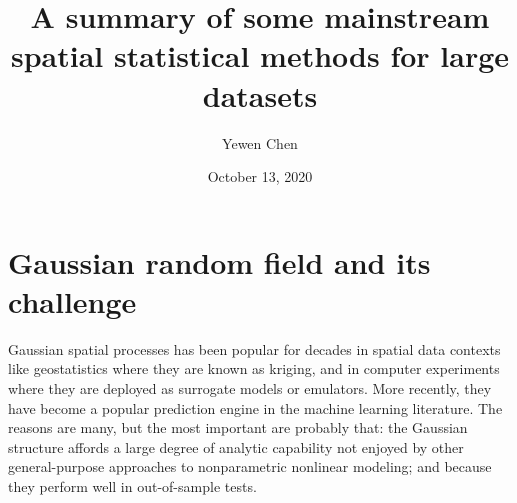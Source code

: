 \documentclass[
12pt, %
a4paper, %
oneside, %
headinclude,footinclude, %
BCOR5mm, %
]{scrartcl}
\title{{A summary of some mainstream spatial statistical methods for large datasets}} %
\author{{Yewen Chen}} %
\date{\normalsize{October 13, 2020}}
\begin{document}
\renewcommand{\UrlFont}{\small\tt}

\setlength{\abovecaptionskip}{0pt}
\setlength{\belowcaptionskip}{10pt}
\renewcommand{\algorithmicrequire}{\textbf{Input:}}  %
\renewcommand{\algorithmicensure}{\textbf{Update step:}} %
\renewcommand{\sectionmark}[1]{\markright{\spacedlowsmallcaps{#1}}} %
\lehead{\mbox{\llap{\small\thepage\kern1em\color{halfgray} \vline}\color{halfgray}\hspace{0.5em}\rightmark\hfil}} %

\pagestyle{scrheadings} %


\maketitle %

\setcounter{tocdepth}{4} %

\tableofcontents %

\listoffigures %

\listoftables %

\newpage
\section{Gaussian random field and its challenge}
Gaussian spatial processes has been popular for decades in spatial data contexts like geostatistics where they are known as kriging, and in computer experiments where they are deployed as surrogate models or emulators. More recently, they have become a popular prediction engine in the machine learning literature. The reasons are many, but the most important are probably that: the Gaussian structure affords a large degree of analytic capability not enjoyed by other general-purpose approaches to nonparametric nonlinear modeling; and because they perform well in out-of-sample tests.
\end{document}
